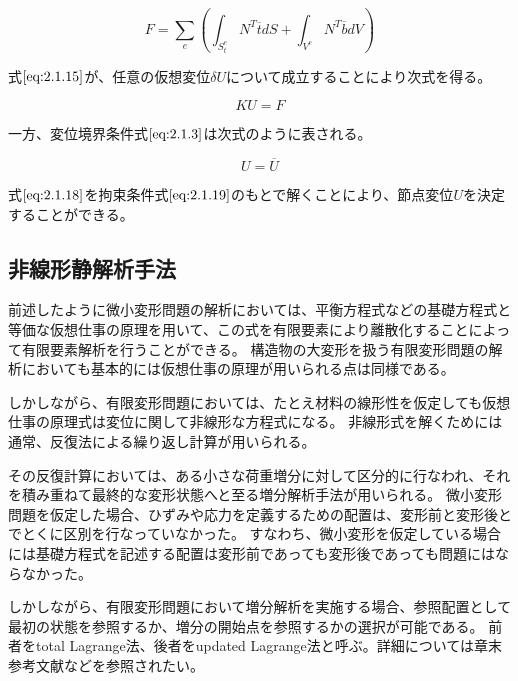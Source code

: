 \documentclass[a4paper,pandoc,ja=standard]{bxjsarticle}
\begin{document}
\begin{equation}
F = \sum_e (\int_{S_t^e} N^T \overline{t} dS + \int_{V^e} N^T \overline{b} dV )
\label{eq:2.1.17}
\end{equation}

式\(\eqref{eq:2.1.15}\)が、任意の仮想変位\(\delta U\)について成立することにより次式を得る。

\begin{equation}
K U = F
\label{eq:2.1.18}
\end{equation}

一方、変位境界条件式\(\eqref{eq:2.1.3}\)は次式のように表される。

\begin{equation}
U = \overline{U}
\label{eq:2.1.19}
\end{equation}

式\(\eqref{eq:2.1.18}\)を拘束条件式\(\eqref{eq:2.1.19}\)のもとで解くことにより、節点変位\(U\)を決定することができる。

\hypertarget{ux975eux7ddaux5f62ux9759ux89e3ux6790ux624bux6cd5}{%
\subsection{非線形静解析手法}\label{ux975eux7ddaux5f62ux9759ux89e3ux6790ux624bux6cd5}}

前述したように微小変形問題の解析においては、平衡方程式などの基礎方程式と等価な仮想仕事の原理を用いて、この式を有限要素により離散化することによって有限要素解析を行うことができる。 構造物の大変形を扱う有限変形問題の解析においても基本的には仮想仕事の原理が用いられる点は同様である。

しかしながら、有限変形問題においては、たとえ材料の線形性を仮定しても仮想仕事の原理式は変位に関して非線形な方程式になる。
非線形式を解くためには通常、反復法による繰り返し計算が用いられる。

その反復計算においては、ある小さな荷重増分に対して区分的に行なわれ、それを積み重ねて最終的な変形状態へと至る増分解析手法が用いられる。
微小変形問題を仮定した場合、ひずみや応力を定義するための配置は、変形前と変形後とでとくに区別を行なっていなかった。
すなわち、微小変形を仮定している場合には基礎方程式を記述する配置は変形前であっても変形後であっても問題にはならなかった。

しかしながら、有限変形問題において増分解析を実施する場合、参照配置として最初の状態を参照するか、増分の開始点を参照するかの選択が可能である。
前者をtotal Lagrange法、後者をupdated Lagrange法と呼ぶ。詳細については章末参考文献などを参照されたい。
\end{document}
